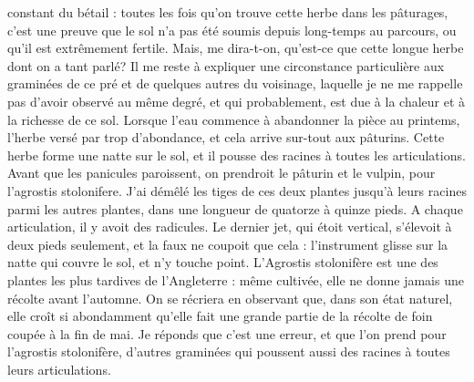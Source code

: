 constant du bétail : toutes les fois qu'on trouve cette herbe dans les pâturages, c'est une preuve que le sol n'a pas été soumis depuis long-temps au parcours, ou qu'il est extrêmement fertile. Mais, me dira-t-on, qu'est-ce que cette longue herbe dont on a tant parlé? Il me reste à expliquer une circonstance particulière aux graminées de ce pré et de quelques autres du voisinage, laquelle je ne me rappelle pas d'avoir observé au même degré, et qui probablement, est due à la chaleur et à la richesse de ce sol. Lorsque l'eau commence à abandonner la pièce au printems, l'herbe versé par trop d'abondance, et cela arrive sur-tout aux pâturins. Cette herbe forme une natte sur le sol, et il pousse des racines à toutes les articulations. Avant que les panicules paroissent, on prendroit le pâturin et le vulpin, pour l'agrostis stolonifere. J'ai démêlé les tiges de ces deux plantes jusqu'à leurs racines parmi les autres plantes, dans une longueur de quatorze à\setcounter{page}{71} quinze pieds. A chaque articulation, il y avoit des radicules. Le dernier jet, qui étoit vertical, s'élevoit à deux pieds seulement, et la faux ne coupoit que cela : l'instrument glisse sur la natte qui couvre le sol, et n'y touche point.
L'Agrostis stolonifère est une des plantes les plus tardives de l'Angleterre : même cultivée, elle ne donne jamais une récolte avant l'automne. On se récriera en observant que, dans son état naturel, elle croît si abondamment qu'elle fait une grande partie de la récolte de foin coupée à la fin de mai. Je réponds que c'est une erreur, et que l'on prend pour l'agrostis stolonifère, d'autres graminées qui poussent aussi des racines à toutes leurs articulations.